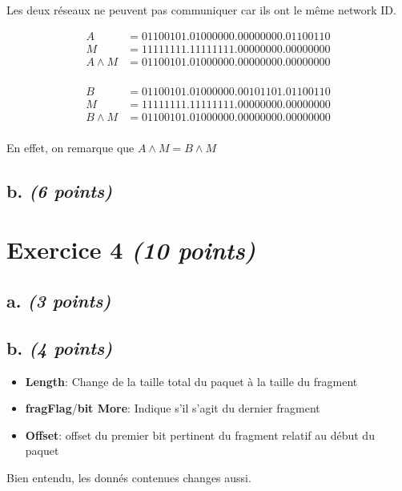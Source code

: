 \documentclass{article}
\begin{document}
Les deux réseaux ne peuvent pas communiquer car ils ont le même network ID.


\noindent \begin{minipage}{9cm}
	\begin{align*}
		A &= 01100101.01000000.00000000.01100110\\
		M &= 11111111.11111111.00000000.00000000\\
		A \land  M &= 01100101.01000000.00000000.00000000\\
	\end{align*}
\end{minipage}
\begin{minipage}{7cm}
	\begin{align*}
		B &= 01100101.01000000.00101101.01100110\\
		M &= 11111111.11111111.00000000.00000000\\
		B \land  M &= 01100101.01000000.00000000.00000000\\
	\end{align*}
\end{minipage}

\hfill

En effet, on remarque que $A \land  M = B \land  M$

\subsection{b. \emph{(6 points)}}

\clearpage

\section{Exercice 4 \emph{(10 points)}}

\subsection{a. \emph{(3 points)}}

\subsection{b. \emph{(4 points)}}
\begin{itemize}
    \item \textbf{Length}: Change de la taille total du paquet à la taille du fragment
    \item \textbf{fragFlag}/\textbf{bit More}: Indique s'il s'agit du dernier fragment
    \item \textbf{Offset}: offset du premier bit pertinent du fragment relatif au début du paquet
\end{itemize}
Bien entendu, les donnés contenues changes aussi.
\end{document}
